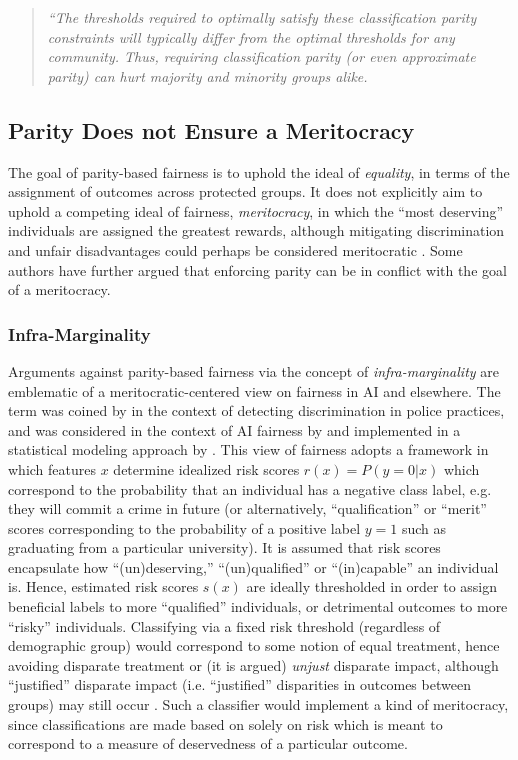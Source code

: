 \documentclass[11pt,dvipdfm]{article}
\begin{document}
\begin{quote}
\emph{``The thresholds required to optimally satisfy these classification parity constraints will typically differ from the optimal thresholds for any community. Thus, requiring classification parity (or even approximate parity) can hurt majority and minority groups alike.} \cite{corbettdavies2018measure}
\end{quote}


\subsection{Parity Does not Ensure a Meritocracy}
The goal of parity-based fairness is to uphold the ideal of \emph{equality}, in terms of the assignment of outcomes across protected groups.  It does not explicitly aim to uphold a competing ideal of fairness, \emph{meritocracy}, in which the ``most deserving'' individuals are assigned the greatest rewards, although mitigating discrimination and unfair disadvantages could perhaps be considered meritocratic \cite{johnson1965remarks}.  Some authors have further argued that enforcing parity can be in conflict with the goal of a meritocracy.
\subsubsection{Infra-Marginality}
Arguments against parity-based fairness via the concept of \emph{infra-marginality} are emblematic of a meritocratic-centered view on fairness in AI and elsewhere.  The term was coined by \cite{ayres2002outcome} in the context of detecting discrimination in police practices, and was considered in the context of AI fairness by \cite{corbettdavies2018measure} and implemented in a statistical modeling approach by \cite{simoiu2017problem}.  This view of fairness adopts a framework in which features $x$ determine idealized risk scores $r(x) = P(y=0|x)$ which correspond to the probability that an individual has a negative class label, e.g. they will commit a crime in future (or alternatively, ``qualification'' or ``merit'' scores corresponding to the probability of a positive label $y=1$ such as graduating from a particular university).  It is assumed that risk scores encapsulate how ``(un)deserving,'' ``(un)qualified'' or ``(in)capable'' an individual is.  Hence, estimated risk scores $s(x)$ are ideally thresholded in order to assign beneficial labels to more ``qualified'' individuals, or detrimental outcomes to more ``risky'' individuals.  Classifying via a fixed risk threshold (regardless of demographic group) would correspond to some notion of equal treatment, hence avoiding disparate treatment or (it is argued) \emph{unjust} disparate impact, although ``justified'' disparate impact (i.e. ``justified'' disparities in outcomes between groups) may still occur \cite{corbettdavies2018measure}.   Such a classifier would implement a kind of meritocracy, since classifications are made based on solely on risk which is meant to correspond to a measure of deservedness of a particular outcome.
\end{document}
